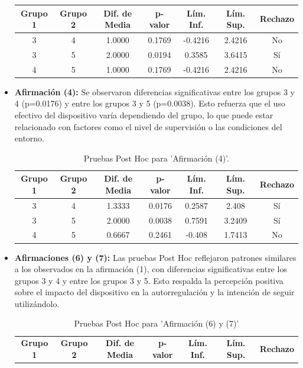 \begin{itemize}
\begin{table}[ht]
\begin{tabularx}{0.75\textwidth}{ccccccc}
						\hline
						\textbf{Grupo 1} & \textbf{Grupo 2} & \textbf{Dif. de Media} & \textbf{p-valor} & \textbf{Lím. Inf.} & \textbf{Lím. Sup.} & \textbf{Rechazo} \\
						\hline
						3 & 4 & 1.0000 & 0.1769 & -0.4216 & 2.4216 & No \\
						3 & 5 & 2.0000 & 0.0194 & 0.3585 & 3.6415 & Sí \\
						4 & 5 & 1.0000 & 0.1769 & -0.4216 & 2.4216 & No \\
						\hline
					\end{tabularx}
					\label{table:posthoc_3}
				\end{table}
				
				\item \textbf{Afirmación (4):} Se observaron diferencias significativas entre los grupos 3 y 4 (p=0.0176) y entre los grupos 3 y 5 (p=0.0038). Esto refuerza que el uso efectivo del dispositivo varía dependiendo del grupo, lo que puede estar relacionado con factores como el nivel de supervisión o las condiciones del entorno.
				\begin{table}[ht]
					\centering
					\caption{Pruebas Post Hoc para 'Afirmación (4)'.}
					\begin{tabularx}{0.75\textwidth}{ccccccc}
						\hline
						\textbf{Grupo 1} & \textbf{Grupo 2} & \textbf{Dif. de Media} & \textbf{p-valor} & \textbf{Lím. Inf.} & \textbf{Lím. Sup.} & \textbf{Rechazo} \\
						\hline
						3 & 4 & 1.3333 & 0.0176 & 0.2587 & 2.408 & Sí \\
						3 & 5 & 2.0000 & 0.0038 & 0.7591 & 3.2409 & Sí \\
						4 & 5 & 0.6667 & 0.2461 & -0.408 & 1.7413 & No \\
						\hline
					\end{tabularx}
					\label{table:posthoc_4}
				\end{table}
				\item \textbf{Afirmaciones (6) y (7):} Las pruebas Post Hoc reflejaron patrones similares a los observados en la afirmación (1), con diferencias significativas entre los grupos 3 y 4 y entre los grupos 3 y 5. Esto respalda la percepción positiva sobre el impacto del dispositivo en la autorregulación y la intención de seguir utilizándolo.
				\begin{table}[ht]
					\centering
					\caption{Pruebas Post Hoc para 'Afirmación (6) y (7)'}
					\begin{tabularx}{0.75\textwidth}{ccccccc}
						\hline
						\textbf{Grupo 1} & \textbf{Grupo 2} & \textbf{Dif. de Media} & \textbf{p-valor} & \textbf{Lím. Inf.} & \textbf{Lím. Sup.} & \textbf{Rechazo} \\

\end{tabularx}
\end{table}
\end{itemize}
